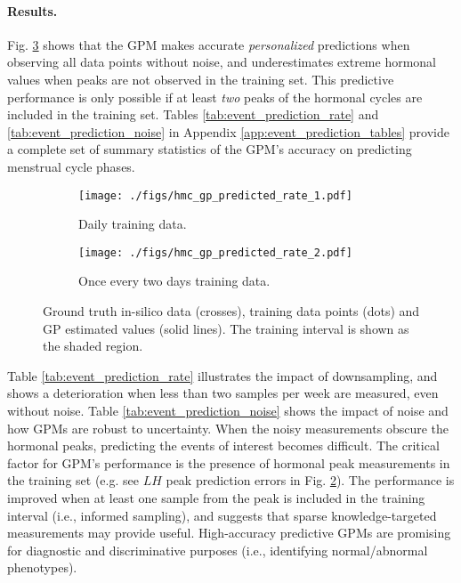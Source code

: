 \documentclass{article}
\newcommand{\ie}{i.e., }
\newcommand{\eg}{e.g. }
\begin{document}
\paragraph*{Results.} Fig. \ref{fig:hmc_predicted_gp} shows that the GPM makes accurate \emph{personalized} predictions when observing all data points without noise, and underestimates extreme hormonal values when peaks are not observed in the training set. This predictive performance is only possible if at least \emph{two} peaks of the hormonal cycles are included in the training set. Tables \ref{tab:event_prediction_rate} and \ref{tab:event_prediction_noise} in Appendix \ref{app:event_prediction_tables} provide a complete set of summary statistics of the GPM's accuracy on predicting menstrual cycle phases.

\begin{figure}[!h]
        \centering
        \begin{subfigure}[b]{0.42\textwidth}
                \texttt{[image: ./figs/hmc\_gp\_predicted\_rate\_1.pdf]}
                \vspace*{-0.7cm}
                \caption{Daily training data.}
                \label{fig:hmc_predicted_gp_rate_1}
        \end{subfigure}
        \begin{subfigure}[b]{0.42\textwidth}
                \texttt{[image: ./figs/hmc\_gp\_predicted\_rate\_2.pdf]}
                \vspace*{-0.7cm}
                \caption{Once every two days training data.}
                \label{fig:hmc_predicted_gp_rate_2}
        \end{subfigure}
        \vspace*{-0.2cm}
		\caption{Ground truth in-silico data (crosses), training data points (dots) and GP estimated values (solid lines). The training interval is shown as the shaded region.}
        \label{fig:hmc_predicted_gp}
\end{figure}

Table \ref{tab:event_prediction_rate} illustrates the impact of downsampling, and shows a deterioration when less than two samples per week are measured, even without noise. Table \ref{tab:event_prediction_noise} shows the impact of noise and how GPMs are robust to uncertainty. When the noisy measurements obscure the hormonal peaks, predicting the events of interest becomes difficult. The critical factor for GPM's performance is the presence of hormonal peak measurements in the training set (\eg see $LH$ peak prediction errors in Fig. \ref{fig:hmc_predicted_gp_rate_2}). The performance is improved when at least one sample from the peak is included in the training interval (\ie informed sampling), and suggests that sparse knowledge-targeted measurements may provide useful. High-accuracy predictive GPMs are promising for diagnostic and discriminative purposes (\ie identifying normal/abnormal phenotypes).
\end{document}
